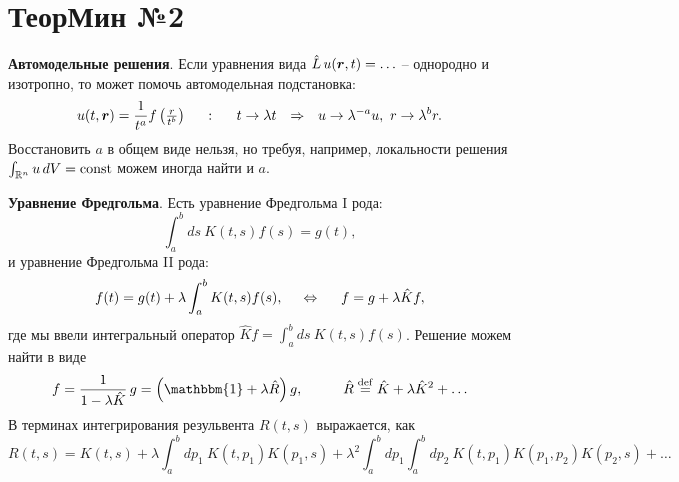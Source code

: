 \section*{ТеорМин №2}


\textbf{Автомодельные решения}. 
Если уравнения вида $\hat{L}\, u(\mbox{\boldmath $r$}, t) = \ldots$ -- однородно и изотропно, то может помочь автомодельная подстановка:
\begin{equation}
	u(t, \mbox{\boldmath $r$}) = \frac{1}{t^a} f\left(\tfrac{r}{t^b}\right)
	\hspace{5 mm} \colon \hspace{5 mm} 
	t \to \lambda t
	\hspace{0.25cm} \Rightarrow \hspace{0.25cm}
	u \to \lambda^{-a} u, \ r \to \lambda^{b} r.
	\label{am}
\end{equation}
Восстановить $a$ в общем виде нельзя, но требуя, например, локальности решения $\int_{\mathbb{R}^n} u \, d V = \textnormal{const}$ можем иногда найти и $a$. 


\textbf{Уравнение Фредгольма}. Есть уравнение Фредгольма I рода:
\begin{equation*}
	\int_{a}^{b} ds\ K(t, s) f(s) = g(t),
\end{equation*}
и уравнение Фредгольма II рода:
\begin{equation}
	f(t) = g(t) + \lambda \int_{a}^{b} K(t, s) f(s),
	\hspace{5 mm} \Leftrightarrow \hspace{5 mm} 
	f = g + \lambda \hat{K} f,
	\label{Feq2}
\end{equation}
где мы ввели интегральный оператор $\hat{K} f = \int_{a}^{b} ds \ K(t, s) f(s)$. Решение можем найти в виде
\begin{equation*}
	f = \frac{1}{1-\lambda \hat{K}}\,  g = \left(\mathbbm{1} + \lambda \hat{R}\right) g,
	\hspace{10 mm} 
	\hat{R} \overset{\mathrm{def}}{=}  \hat{K} + \lambda \hat{K}^2 + \ldots
\end{equation*}
В терминах интегрирования резульвента $R (t, s)$ выражается, как
\begin{equation}
	R(t,s) = K(t, s) + \lambda \int_{a}^{b}d p_1\  K(t, p_1) K(p_1, s) + 
	\lambda^2 \int_{a}^{b} d p_1 \int_{a}^{b} d p_2 \ K(t, p_1) K(p_1, p_2) K(p_2, s) + \ldots
	\label{FeqRI}
\end{equation}

\newpage